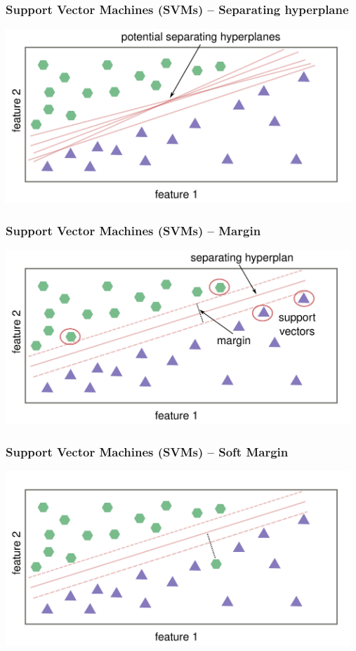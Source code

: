 \documentclass[aspectratio=169]{beamer}
\begin{document}
\begin{frame}
  \frametitle{Support Vector Machines (SVMs) -- Separating hyperplane}
  \begin{center}
    \includegraphics[width=13.0cm]{images/svm_potential_separating_hyperplanes.pdf}
  \end{center}
\end{frame}

\begin{frame}
  \frametitle{Support Vector Machines (SVMs) -- Margin}
  \begin{center}
    \includegraphics[width=13.0cm]{images/svm_with_margin.pdf}
  \end{center}
\end{frame}

\begin{frame}
  \frametitle{Support Vector Machines (SVMs) -- Soft Margin}
  \begin{center}
    \includegraphics[width=13.0cm]{images/svm_with_soft_margin.pdf}
  \end{center}
\end{frame}
\end{document}
